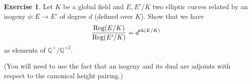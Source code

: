 \documentclass[12pt]{amsart}
\numberwithin{equation}{section}
\theoremstyle{remark}
\theoremstyle{definition}
\theoremstyle{definition}
\theoremstyle{definition}
\theoremstyle{definition}
\theoremstyle{definition}
\theoremstyle{definition}
\newtheorem{exercise}[equation]{Exercise}
\theoremstyle{definition}
\begin{document}
 
 \begin{exercise}
 Let $K$ be a global field and $E,E'/K$ two elliptic curves related by an isogeny $\phi:E\rightarrow E'$ of degree $d$ (defined over $K$). Show that we have 
 \[\frac{\textup{Reg}(E/K)}{\textup{Reg}(E'/K)}=d^{\textup{rk}(E/K)}\]
 as elements of $\mathbb{Q}^\times/\mathbb{Q}^{\times 2}$. 
 
 (You will need to use the fact that an isogeny and its dual are adjoints with respect to the canonical height pairing.)
 \end{exercise}
 
\end{document}
